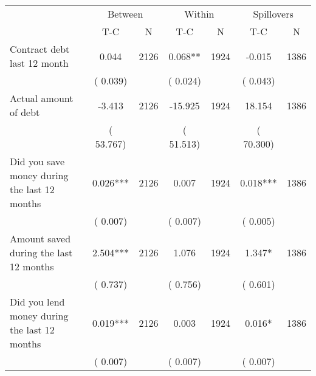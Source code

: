 
\begin{tabular}{l*{6}{c}}\hline&\multicolumn{2}{c}{Between}&\multicolumn{2}{c}{Within}&\multicolumn{2}{c}{Spillovers} \\ \cmidrule(r){2-3}\cmidrule(l){4-5}\cmidrule(l){6-7} & {T-C} & {N} & {T-C} & {N}  & {T-C}  & {N}  \\ \midrule
Contract debt last 12 month        &              0.044      &       2126       &              0.068**      &       1924       &             -0.015      &       1386       \\
                       &       (       0.039)            &                               &       (       0.024)            &                               &       (       0.043)            &                               \\
Actual amount of debt        &             -3.413      &       2126       &            -15.925      &       1924       &             18.154      &       1386       \\
                       &       (      53.767)            &                               &       (      51.513)            &                               &       (      70.300)            &                               \\
Did you save money during the last 12 months        &              0.026***      &       2126       &              0.007      &       1924       &              0.018***      &       1386       \\
                       &       (       0.007)            &                               &       (       0.007)            &                               &       (       0.005)            &                               \\
Amount saved during the last 12 months        &              2.504***      &       2126       &              1.076      &       1924       &              1.347*      &       1386       \\
                       &       (       0.737)            &                               &       (       0.756)            &                               &       (       0.601)            &                               \\
Did you lend money during the last 12 months        &              0.019***      &       2126       &              0.003      &       1924       &              0.016*      &       1386       \\
                       &       (       0.007)            &                               &       (       0.007)            &                               &       (       0.007)            &                               \\
\hline \end{tabular}
